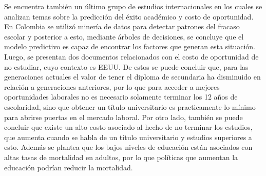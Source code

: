 Se encuentra también un último grupo de estudios internacionales en los cuales se analizan temas sobre la predicción del éxito académico y costo de oportunidad. En Colombia se utilizó minería de datos para detectar patrones del fracaso escolar y posterior a esto, mediante árboles de decisiones, se concluye que el modelo predictivo es capaz de encontrar los factores que generan esta situación. Luego, se presentan dos documentos relacionados con el costo de oportunidad de no estudiar, cuyo contexto es EEUU. De estos se puede concluir que, para las generaciones actuales el valor de tener el diploma de secundaria ha disminuido en relación a generaciones anteriores, por lo que para acceder a mejores oportunidades laborales no es necesario solamente terminar los 12 años de escolaridad, sino que obtener un título universitario es practicamente lo mínimo para abrirse puertas en el mercado laboral. Por otro lado, también se puede concluir que existe un alto costo asociado al hecho de no terminar los estudios, que aumenta cuando se habla de un título universitario y estudios superiores a esto. Además se plantea que los bajos niveles de educación están asociados con altas tasas de mortalidad en adultos, por lo que políticas que aumentan la educación podrían reducir la mortalidad.